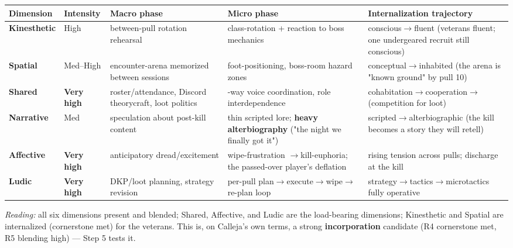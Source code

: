 \documentclass[11pt]{report}
\begin{document}
\begin{table}[H]
\small
\renewcommand{\arraystretch}{1.25}
\begin{tabularx}{\textwidth}{>{\RaggedRight\arraybackslash}X>{\RaggedRight\arraybackslash}X>{\RaggedRight\arraybackslash}X>{\RaggedRight\arraybackslash}X>{\RaggedRight\arraybackslash}X}
\toprule
Dimension & Intensity & Macro phase & Micro phase & Internalization trajectory \\
\midrule
\textbf{Kinesthetic} & High & between-pull rotation rehearsal & class-rotation + reaction to boss mechanics & conscious$\rightarrow$\allowbreak fluent (veterans fluent; one undergeared recruit still conscious) \\
\textbf{Spatial} & Med–High & encounter-arena memorized between sessions & foot-positioning, boss-room hazard zones & conceptual$\rightarrow$\allowbreak inhabited (the arena is "known ground" by pull 10) \\
\textbf{Shared} & \textbf{Very high} & roster/attendance, Discord theorycraft, loot politics & 25-way voice coordination, role interdependence & cohabitation$\rightarrow$\allowbreak cooperation$\rightarrow$\allowbreak (competition for loot) \\
\textbf{Narrative} & Med & speculation about post-kill content & thin scripted lore; \textbf{heavy alterbiography} ("the night we finally got it") & scripted$\rightarrow$\allowbreak alterbiographic (the kill becomes a story they will retell) \\
\textbf{Affective} & \textbf{Very high} & anticipatory dread/excitement & wipe-frustration $\rightarrow$\allowbreak  kill-euphoria; the passed-over player's deflation & rising tension across pulls; discharge at the kill \\
\textbf{Ludic} & \textbf{Very high} & DKP/loot planning, strategy revision & per-pull plan$\rightarrow$\allowbreak execute$\rightarrow$\allowbreak wipe$\rightarrow$\allowbreak re-plan loop & strategy$\rightarrow$\allowbreak tactics$\rightarrow$\allowbreak microtactics fully operative \\
\bottomrule
\end{tabularx}
\end{table}


\textit{Reading:} all six dimensions present and blended; Shared, Affective, and Ludic are the load-bearing dimensions; Kinesthetic and Spatial are internalized (cornerstone met) for the veterans. This is, on Calleja's own terms, a strong \textbf{incorporation} candidate (R4 cornerstone met, R5 blending high) — Step 5 tests it.
\end{document}
